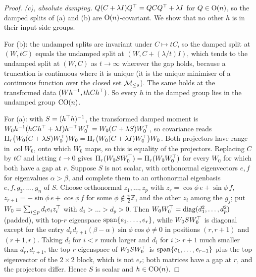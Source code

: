 \begin{proof}
\emph{(c), absolute damping.} $Q(C+\lambda I)Q^{\top}=QCQ^{\top}+\lambda I$ for $Q\in\mathrm{O}(n)$, so the damped splits of (a) and (b) are
$\mathrm{O}(n)$-covariant. We show that no other $h$ is in their input-side groups.

For (b): the undamped splits are invariant under $C\mapsto tC$, so the damped split at $(W,tC)$ equals the undamped split at
$(W,C+(\lambda/t)I)$, which tends to the undamped split at $(W,C)$ as $t\to\infty$ wherever the gap holds, because a truncation is
continuous where it is unique (it is the unique minimiser of a continuous function over the closed set $\mathcal{M}_{\le s}$). The same
holds at the transformed data $(Wh^{-1},thCh^{\top})$. So every $h$ in the damped group lies in the undamped group $\mathrm{CO}(n)$.

For (a): with $S=(h^{\top} h)^{-1}$, the transformed damped moment is $W_0h^{-1}(hCh^{\top}+\lambda I)h^{-\top}W_0^{\top}=W_0(C+\lambda S)W_0^{\top}$, so
covariance reads $\Pi_r\big(W_0(C+\lambda S)W_0^{\top}\big)W_0=\Pi_r\big(W_0(C+\lambda I)W_0^{\top}\big)W_0$. Both projectors have range in
$\operatorname{col}W_0$, onto which $W_0$ maps, so this is equality of the projectors. Replacing $C$ by $tC$ and letting $t\to0$
gives $\Pi_r(W_0SW_0^{\top})=\Pi_r(W_0W_0^{\top})$ for every $W_0$ for which both have a gap at $r$. Suppose $S$ is not scalar, with
orthonormal eigenvectors $e,f$ for eigenvalues $\alpha>\beta$, and complete them to an orthonormal eigenbasis $e,f,g_3,\dots,g_n$ of
$S$. Choose orthonormal $z_1,\dots,z_p$ with $z_r=\cos\phi\,e+\sin\phi\,f$, $z_{r+1}=-\sin\phi\,e+\cos\phi\,f$ for some
$\phi\notin\tfrac\pi2\mathbb Z$, and the other $z_i$ among the $g_j$; put $W_0=\sum_{i\le p}d_ie_iz_i^{\top}$ with $d_1>\dots>d_p>0$.
Then $W_0W_0^{\top}=\operatorname{diag}(d_1^2,\dots,d_p^2)$ (padded), with top-$r$ eigenspace $\operatorname{span}\{e_1,\dots,e_r\}$, while $W_0SW_0^{\top}$ is
diagonal except for the entry $d_rd_{r+1}(\beta-\alpha)\sin\phi\cos\phi\ne0$ in positions $(r,r+1)$ and $(r+1,r)$. Taking $d_i$ for
$i<r$ much larger and $d_i$ for $i>r+1$ much smaller than $d_r,d_{r+1}$, the top-$r$ eigenspace of $W_0SW_0^{\top}$ is
$\operatorname{span}\{e_1,\dots,e_{r-1}\}$ plus the top eigenvector of the $2\times2$ block, which is not $e_r$; both matrices have a gap at
$r$, and the projectors differ. Hence $S$ is scalar and $h\in\mathrm{CO}(n)$.


\end{proof}

